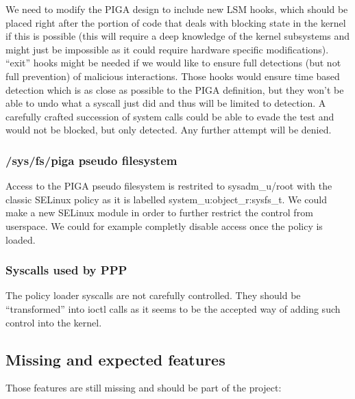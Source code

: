 \documentclass[pdftex,a4paper,titlepage,11pt]{article}
\begin{document}


\bigskip

We need to modify the PIGA design to include new LSM hooks, which should be
placed right after the portion of code that deals with blocking state in the
kernel if this is possible (this will require a deep knowledge of the kernel
subsystems and might just be impossible as it could require hardware specific
modifications). ``exit'' hooks might be needed if we would like to ensure full
detections (but not full prevention) of malicious interactions. Those hooks
would ensure time based detection which is as close as possible to the PIGA
definition, but they won't be able to undo what a syscall just did and thus will
be limited to detection. A carefully crafted succession of system calls could be
able to evade the test and would not be blocked, but only detected. Any further
attempt will be denied.



\subsubsection{/sys/fs/piga pseudo filesystem}

Access to the PIGA pseudo filesystem is restrited to sysadm\_u/root with the
classic SELinux policy as it is labelled system\_u:object\_r:sysfs\_t. We could
make a new SELinux module in order to further restrict the control from
userspace. We could for example completly disable access once the policy is
loaded.

\subsubsection{Syscalls used by PPP}

The policy loader syscalls are not carefully controlled. They should be
``transformed'' into ioctl calls as it seems to be the accepted way of adding
such control into the kernel.

\subsection{Missing and expected features}

Those features are still missing and should be part of the project:
\end{document}
